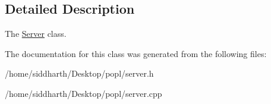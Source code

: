 \subsection{Detailed Description}
The \hyperlink{class_server}{Server} class. 

The documentation for this class was generated from the following files\+:\begin{DoxyCompactItemize}
\item 
/home/siddharth/\+Desktop/popl/server.\+h\item 
/home/siddharth/\+Desktop/popl/server.\+cpp\end{DoxyCompactItemize}
